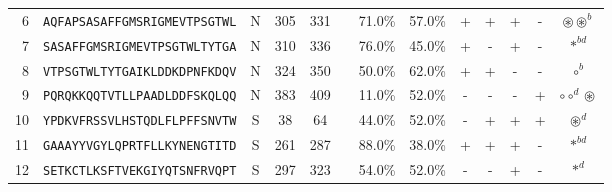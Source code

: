 \begin{tabular}{rcccccccccccc}
6  &  \texttt{AQFAPSASAFFGMSRIGMEVTPSGTWL} &       N &    305 &   331 &                &                          71.0\% &                           57.0\% &          + &           + &          + &           - &                                                                                                                  $ \circledast \circledast^b $ \\
7  &  \texttt{SASAFFGMSRIGMEVTPSGTWLTYTGA} &       N &    310 &   336 &                &                          76.0\% &                           45.0\% &          + &           - &          + &           - &                                                                                                                                  $ \ast^{bd} $ \\
8  &  \texttt{VTPSGTWLTYTGAIKLDDKDPNFKDQV} &       N &    324 &   350 &                &                          50.0\% &                           62.0\% &          + &           + &          - &           - &                                                                                                                                    $ \circ^b $ \\
9  &  \texttt{PQRQKKQQTVTLLPAADLDDFSKQLQQ} &       N &    383 &   409 &                &                          11.0\% &                           52.0\% &          - &           - &          - &           + &                                                                                                                  $ \circ \circ^d \circledast $ \\
10 &  \texttt{YPDKVFRSSVLHSTQDLFLPFFSNVTW} &       S &     38 &    64 &                &                          44.0\% &                           52.0\% &          - &           + &          + &           + &                                                                                                                              $ \circledast^d $ \\
11 &  \texttt{GAAAYYVGYLQPRTFLLKYNENGTITD} &       S &    261 &   287 &                &                          88.0\% &                           38.0\% &          + &           + &          + &           - &                                                                                                                                  $ \ast^{bd} $ \\
12 &  \texttt{SETKCTLKSFTVEKGIYQTSNFRVQPT} &       S &    297 &   323 &                &                          54.0\% &                           52.0\% &          - &           - &          + &           - &                                                                                                                                     $ \ast^d $ \\

\end{tabular}
